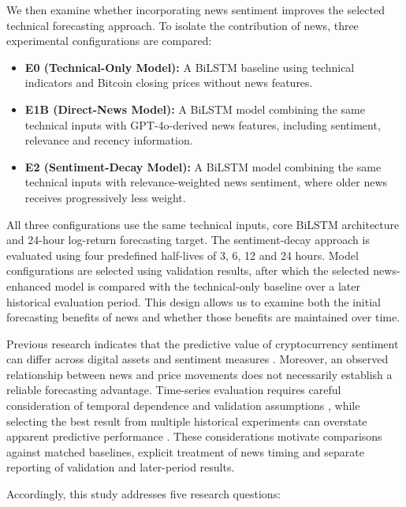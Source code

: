 We then examine whether incorporating news sentiment improves the selected technical forecasting approach. To isolate the contribution of news, three experimental configurations are compared:

\begin{itemize}
    \item \textbf{E0 (Technical-Only Model):} A BiLSTM baseline using technical indicators and Bitcoin closing prices without news features.

    \item \textbf{E1B (Direct-News Model):} A BiLSTM model combining the same technical inputs with GPT-4o-derived news features, including sentiment, relevance and recency information.

    \item \textbf{E2 (Sentiment-Decay Model):} A BiLSTM model combining the same technical inputs with relevance-weighted news sentiment, where older news receives progressively less weight.
\end{itemize}

All three configurations use the same technical inputs, core BiLSTM architecture and 24-hour log-return forecasting target. The sentiment-decay approach is evaluated using four predefined half-lives of 3, 6, 12 and 24 hours. Model configurations are selected using validation results, after which the selected news-enhanced model is compared with the technical-only baseline over a later historical evaluation period. This design allows us to examine both the initial forecasting benefits of news and whether those benefits are maintained over time.

Previous research indicates that the predictive value of cryptocurrency sentiment can differ across digital assets and sentiment measures \citep{Kraaijeveld2020}. Moreover, an observed relationship between news and price movements does not necessarily establish a reliable forecasting advantage. Time-series evaluation requires careful consideration of temporal dependence and validation assumptions \citep{Bergmeir2018}, while selecting the best result from multiple historical experiments can overstate apparent predictive performance \citep{Sullivan1999}. These considerations motivate comparisons against matched baselines, explicit treatment of news timing and separate reporting of validation and later-period results.

Accordingly, this study addresses five research questions:

